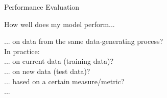 

\begin{vbframe}{Performance Evaluation}
\begin{center}
How well does my model perform...\\

\lz


\lz
... on data from the same data-generating process?\\
\lz
In practice:\\
\lz
... on current data (training data)?\\
... on new data (test data)?\\
... based on a certain measure/metric?\\
...

\end{center}
\end{vbframe}




